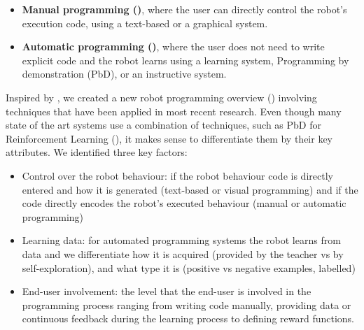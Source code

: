\begin{itemize}
  \item {\textbf{Manual programming ()}, where the user can directly control the robot's execution code, using a text-based or a graphical system.}
  \item {\textbf{Automatic programming ()}, where the user does not need to write explicit code and the robot learns using a learning system, Programming by demonstration (PbD), or an instructive system.}
\end{itemize}


Inspired by \cite{Biggs2003}, we created a new robot programming overview () involving techniques that have been applied in most recent research.
Even though many state of the art systems use a combination of techniques, such as PbD for Reinforcement Learning (\cite{hester2017learning}), it makes sense to differentiate them by their key attributes.
We identified three key factors: 
\begin{itemize}
	\item Control over the robot behaviour: if the robot behaviour code is directly entered and how it is generated (text-based or visual programming) and if the code directly encodes the robot's executed behaviour (manual or automatic programming)
	\item Learning data: for automated programming systems the robot learns from data and we differentiate how it is acquired (provided by the teacher vs by self-exploration), and what type it is (\eg positive vs negative examples, labelled)
	\item End-user involvement: the level that the end-user is involved in the programming process ranging from writing code manually, providing data or continuous feedback during the learning process to defining reward functions.
\end{itemize}

